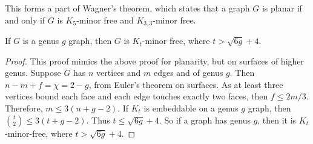 This forms a part of Wagner's theorem, which states that a graph $G$ is planar if and only if $G$ is $K_5$-minor free and $K_{3,3}$-minor free. 

\begin{theorem}\label{thm:bounded_genus_kt_free}
	If \(G\) is a genus \(g\) graph, then \(G\) is \(K_t\)-minor free, where \(t > \sqrt{6g} + 4\). 
\end{theorem}
\begin{proof}
	This proof mimics the above proof for planarity, but on surfaces of higher genus. 
	Suppose \(G\) has \(n\) vertices and \(m\) edges and of genus $g$. Then \(n - m + f = \chi = 2-g\), from Euler's theorem on surfaces. As at least three vertices bound each face and each edge touches exactly two faces, then \(f \leq 2m/3\). Therefore, \(m \leq 3(n + g - 2)\). If \(K_t\) is embeddable on a genus \(g\) graph, then \(\binom{t}{2} \leq 3 (t + g - 2)\). Thus \(t \leq \sqrt{6g} + 4\). So if a graph has genus \(g\), then it is \(K_t\)-minor-free, where \(t > \sqrt{6g} + 4\). 
\end{proof}